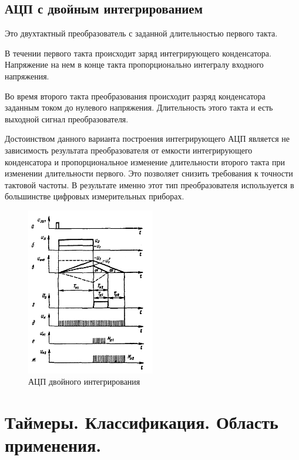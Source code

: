 \documentclass[unicode, 12pt, a4paper, oneside]{article}
\begin{document}
\subsection*{АЦП с двойным интегрированием}

Это двухтактный преобразователь с заданной длительностью первого такта.

В течении первого такта происходит заряд интегрирующего конденсатора. Напряжение на нем в конце такта пропорционально интегралу входного напряжения.

Во время второго такта преобразования происходит разряд конденсатора заданным током до нулевого напряжения. Длительность этого такта и есть выходной сигнал преобразователя.

Достоинством данного варианта построения интегрирующего АЦП является не зависимость результата преобразователя от емкости интегрирующего конденсатора и пропорциональное изменение длительности второго такта при изменении длительности первого. Это позволяет снизить требования к точности тактовой частоты. В результате именно этот тип преобразователя используется в большинстве цифровых измерительных приборах.

\begin{figure}[H]
\centering
\includegraphics[width=0.5\textwidth]{17_ADC_2INT.png}
\caption{АЦП двойного интегрирования}
\label{fig:17_ADC_2INT}
\end{figure}


\section{Таймеры. Классификация. Область применения.}
\end{document}
